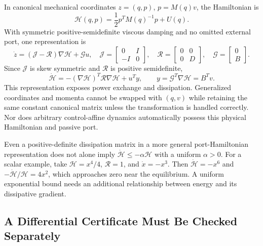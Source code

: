 In canonical mechanical coordinates $z=(q,p)$, $p=M(q)v$, the Hamiltonian is
\begin{equation}
\mathcal H(q,p)=\frac12p^TM(q)^{-1}p+U(q).
\end{equation}
With symmetric positive-semidefinite viscous damping and no omitted external port, one representation is
\begin{equation}
\dot z=(\mathcal J-\mathcal R)\nabla\mathcal H+\mathcal G u,
\quad \mathcal J=\begin{bmatrix}0&I\\-I&0\end{bmatrix},\quad
\mathcal R=\begin{bmatrix}0&0\\0&D\end{bmatrix},\quad
\mathcal G=\begin{bmatrix}0\\B\end{bmatrix}.
\label{eq:ch3:port-hamiltonian}
\end{equation}
Since $\mathcal J$ is skew symmetric and $\mathcal R$ is positive semidefinite,
\begin{equation}
\dot{\mathcal H}=-(\nabla\mathcal H)^T\mathcal R\nabla\mathcal H+u^Ty,
\qquad y=\mathcal G^T\nabla\mathcal H=B^Tv.
\end{equation}
This representation exposes power exchange and dissipation. Generalized coordinates and momenta cannot be swapped with $(q,v)$ while retaining the same constant canonical matrix unless the transformation is handled correctly. Nor does arbitrary control-affine dynamics automatically possess this physical Hamiltonian and passive port.

Even a positive-definite dissipation matrix in a more general port-Hamiltonian representation does not alone imply $\dot{\mathcal H}\le-\alpha\mathcal H$ with a uniform $\alpha>0$. For a scalar example, take $\mathcal H=x^4/4$, $\mathcal R=1$, and $\dot x=-x^3$. Then $\dot{\mathcal H}=-x^6$ and $-\dot{\mathcal H}/\mathcal H=4x^2$, which approaches zero near the equilibrium. A uniform exponential bound needs an additional relationship between energy and its dissipative gradient.

\subsection{A Differential Certificate Must Be Checked Separately}

